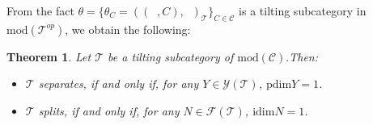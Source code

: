\documentclass{amsart}
\newtheorem{theorem}{Theorem}
\theoremstyle{plain}
\numberwithin{equation}{section}
\begin{document}
From the fact $\theta =\{\theta _{C}=((\;\;,C),\;\;)_\mathcal{T}\}_{C\in
\mathcal{C}}$ is a tilting subcategory in $\mathrm{mod}(\mathcal{T}^{op})$,
we obtain the following:

\begin{theorem}
Let $\mathcal{T}$ be a tilting subcategory of $\mathrm{mod}(\mathcal{C}).$Then:

\begin{itemize}
\item[(a)] $\mathcal{T}$ separates, if and only if, for any $Y\in \mathscr{Y}(\mathcal{T})$, $\mathrm{pdim}Y=1$.

\item[(b)] $\mathcal{T}$ splits, if and only if, for any $N\in \mathscr{F}(\mathcal{T})$, $\mathrm{idim}N=1$.
\end{itemize}
\end{theorem}
\end{document}
